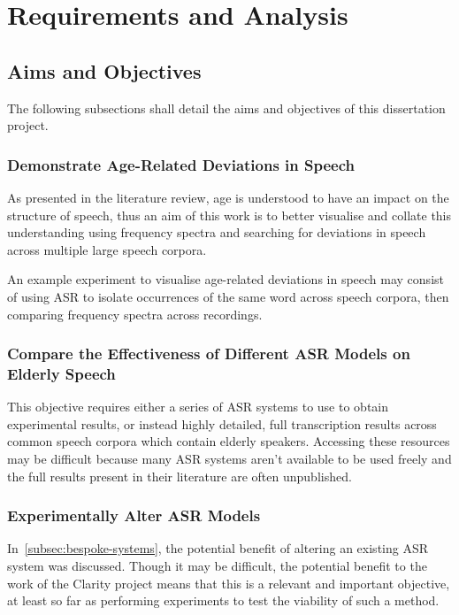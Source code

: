 \chapter{Requirements and Analysis}\label{ch:requirements-and-analysis}

\section{Aims and Objectives}\label{sec:aims-and-objectives2}

The following subsections shall detail the aims and objectives of this dissertation project.

\subsection{Demonstrate Age-Related Deviations in Speech}\label{subsec:aim1}

As presented in the literature review, age is understood to have an impact on the structure of
speech, thus an aim of this work is to better visualise and collate this understanding using
frequency spectra and searching for deviations in speech across multiple large speech corpora.

An example experiment to visualise age-related deviations in speech may consist of using ASR to
isolate occurrences of the same word across speech corpora, then comparing frequency spectra
across recordings.

\subsection{Compare the Effectiveness of Different ASR Models on Elderly Speech}\label{subsec:aim2}

This objective requires either a series of ASR systems to use to obtain experimental results, or
instead highly detailed, full transcription results across common speech corpora which contain
elderly speakers.
Accessing these resources may be difficult because many ASR systems aren't available to be used
freely and the full results present in their literature are often unpublished.


\subsection{Experimentally Alter ASR Models}\label{subsec:aim3}

In~\ref{subsec:bespoke-systems}, the potential benefit of altering an existing ASR system was
discussed.
Though it may be difficult, the potential benefit to the work of the Clarity project means that
this is a relevant and important objective, at least so far as performing experiments to test the
viability of such a method.

